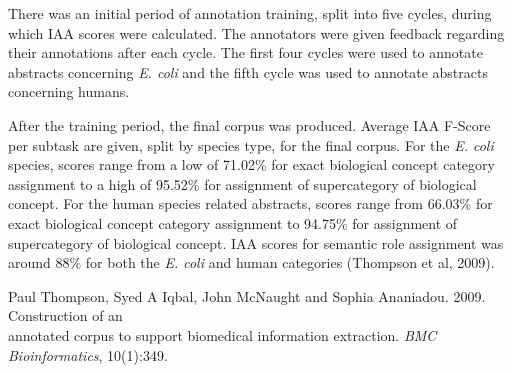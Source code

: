 \documentclass[11pt]{article}
\begin{document}
There was an initial period of annotation training, split into five cycles, during which IAA scores were calculated.  The annotators were given feedback regarding their annotations after each cycle.  The first four cycles were used to annotate abstracts concerning {\it E. coli} and the fifth cycle was used to annotate abstracts concerning humans.  


After the training period, the final corpus was produced.  Average IAA F-Score per subtask are given, split by species type, for the final corpus.  For the {\it E. coli} species, scores range from a low of 71.02\% for exact biological concept category assignment to a high of 95.52\% for assignment of supercategory of biological concept.  For the human species related abstracts, scores range from 66.03\% for exact biological concept category assignment to 94.75\% for assignment of supercategory of biological concept.  IAA scores for semantic role assignment was around 88\% for both the {\it E. coli} and human categories (Thompson et al, 2009).\\






\noindent Paul Thompson, Syed A Iqbal, John McNaught and Sophia Ananiadou. 2009. Construction of an \\ \indent annotated corpus to support biomedical information extraction. {\em BMC Bioinformatics}, 10(1):349.
\end{document}
